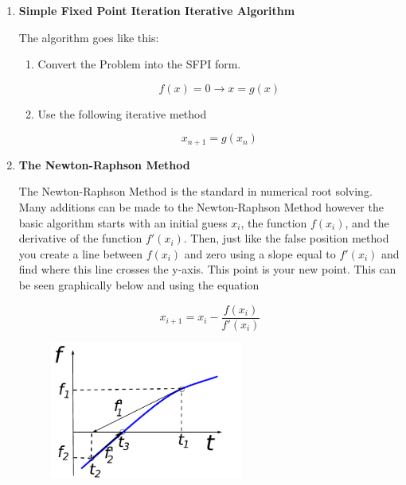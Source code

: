 \begin{enumerate}
\item {\bf Simple Fixed Point Iteration Iterative Algorithm}

The algorithm goes like this:

\begin{enumerate}

\item Convert the Problem into the SFPI form.

\begin{equation}\nonumber
f(x) = 0 \rightarrow x = g(x)
\end{equation}

\item Use the following iterative method

\begin{equation}\nonumber
x_{n+1} = g(x_n)
\end{equation}

\end{enumerate}

\item {\bf The Newton-Raphson Method}

The Newton-Raphson Method is the standard in numerical root
solving. Many additions can be made to the Newton-Raphson Method
however the basic algorithm starts with an initial guess $x_i$,
the function $f(x_i)$, and the derivative of the function
$f'(x_i)$. Then, just like the false position method you create a line
between $f(x_i)$ and zero using a slope equal to $f'(x_i)$ and find
where this line crosses the y-axis. This point is your new point. This
can be seen graphically below and using the equation

\begin{equation}
x_{i+1} = x_i - \frac{f(x_i)}{f'(x_i)}
\end{equation}

\begin{figure}[htb]
  \begin{center}
    \includegraphics[height=0.45\textwidth,width=0.6\textwidth]{Graphics/NewtonRaphson.pdf}
  \end{center}
\end{figure}


\end{enumerate}
